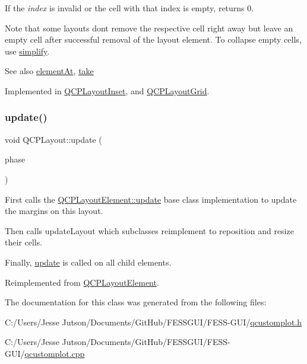 If the {\itshape index} is invalid or the cell with that index is empty, returns 0.

Note that some layouts don\textquotesingle{}t remove the respective cell right away but leave an empty cell after successful removal of the layout element. To collapse empty cells, use \hyperlink{class_q_c_p_layout_a41e6ac049143866e8f8b4964efab01b2}{simplify}.

\begin{DoxySeeAlso}{See also}
\hyperlink{class_q_c_p_layout_afa73ca7d859f8a3ee5c73c9b353d2a56}{element\+At}, \hyperlink{class_q_c_p_layout_ada26cd17e56472b0b4d7fbbc96873e4c}{take} 
\end{DoxySeeAlso}


Implemented in \hyperlink{class_q_c_p_layout_inset_ad6756a3b507e20496aaf7f5ca16c47d1}{Q\+C\+P\+Layout\+Inset}, and \hyperlink{class_q_c_p_layout_grid_acc1277394ff8a6432e111ff9463e6375}{Q\+C\+P\+Layout\+Grid}.

\hypertarget{class_q_c_p_layout_a34ab477e820537ded7bade4399c482fd}{}\label{class_q_c_p_layout_a34ab477e820537ded7bade4399c482fd} 
\subsubsection{\texorpdfstring{update()}{update()}}
{\footnotesize\ttfamily void Q\+C\+P\+Layout\+::update (\begin{DoxyParamCaption}\item[{\hyperlink{class_q_c_p_layout_element_a0d83360e05735735aaf6d7983c56374d}{Update\+Phase}}]{phase }\end{DoxyParamCaption})\hspace{0.3cm}{\ttfamily [virtual]}}

First calls the \hyperlink{class_q_c_p_layout_element_a929c2ec62e0e0e1d8418eaa802e2af9b}{Q\+C\+P\+Layout\+Element\+::update} base class implementation to update the margins on this layout.

Then calls update\+Layout which subclasses reimplement to reposition and resize their cells.

Finally, \hyperlink{class_q_c_p_layout_a34ab477e820537ded7bade4399c482fd}{update} is called on all child elements. 

Reimplemented from \hyperlink{class_q_c_p_layout_element_a929c2ec62e0e0e1d8418eaa802e2af9b}{Q\+C\+P\+Layout\+Element}.



The documentation for this class was generated from the following files\+:\begin{DoxyCompactItemize}
\item 
C\+:/\+Users/\+Jesse Jutson/\+Documents/\+Git\+Hub/\+F\+E\+S\+S\+G\+U\+I/\+F\+E\+S\+S-\/\+G\+U\+I/\hyperlink{qcustomplot_8h}{qcustomplot.\+h}\item 
C\+:/\+Users/\+Jesse Jutson/\+Documents/\+Git\+Hub/\+F\+E\+S\+S\+G\+U\+I/\+F\+E\+S\+S-\/\+G\+U\+I/\hyperlink{qcustomplot_8cpp}{qcustomplot.\+cpp}\end{DoxyCompactItemize}
